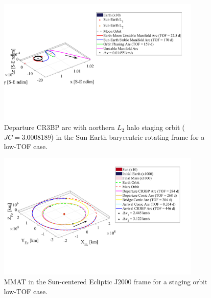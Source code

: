 \begin{figure}[!htb]
    \centering
    \includegraphics[width=0.9\textwidth]{figures/StagedMinTOFSE.pdf}
    \caption{Departure CR3BP arc with northern $L_{2}$ halo staging orbit ($JC=3.0008189$) in the Sun-Earth barycentric rotating frame for a low-TOF case.}
    \label{fig:stagedMinTOFSE}
\end{figure}

\begin{figure}[!htb]
    \centering
    \includegraphics[width=0.9\textwidth]{figures/StagedMinTOFMMAT.pdf}
    \caption{MMAT in the Sun-centered Ecliptic J2000 frame for a staging orbit low-TOF case.}
    \label{fig:stagedMinTOFMMAT}
\end{figure}

